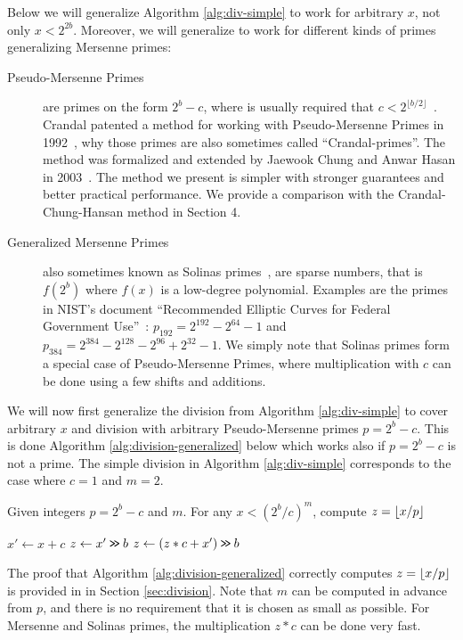 Below we will generalize Algorithm \ref{alg:div-simple} to work for
arbitrary $x$, not only $x<2^{2b}$. Moreover, we will generalize
to work for different kinds of primes generalizing Mersenne primes:
\begin{description}
   \item[Pseudo-Mersenne Primes]
      are primes on the form $2^b-c$, where is usually required that $c < 2^{\lfloor b/2\rfloor}$~\cite{van2014encyclopedia}.
      Crandal patented a method for working with Pseudo-Mersenne Primes in 1992~\cite{crandall1992method},
      why those primes are also sometimes called ``Crandal-primes''.
      The method was formalized and extended by Jaewook Chung and Anwar Hasan in 2003~\cite{chung2003more}. The method we present is simpler with
      stronger guarantees and better practical performance.
      We provide a comparison with the Crandal-Chung-Hansan method in Section 4.
   \item[Generalized Mersenne Primes]
      also sometimes known as Solinas primes~\cite{Solinas2011}, are sparse numbers, that is $f(2^b)$ where $f(x)$ is a low-degree polynomial.
      Examples are the primes in NIST's document ``Recommended Elliptic Curves for Federal Government Use''~\cite{nist}:
         $p_{192} = 2^{192} - 2^{64} - 1$
      and
         $p_{384} = 2^{384}-2^{128}-2^{96}+2^{32}-1$.
      We simply note that Solinas primes form a special case of
      Pseudo-Mersenne Primes, where multiplication with $c$
      can be done using a few shifts and additions.
\end{description}
We will now first generalize the division from Algorithm \ref{alg:div-simple}
to cover arbitrary $x$ and division with arbitrary Pseudo-Mersenne primes $p=2^b-c$. This is done Algorithm \ref{alg:division-generalized} below which
works also if $p=2^b-c$ is not a prime.  The
simple division in Algorithm \ref{alg:div-simple} corresponds to the case
where $c=1$ and $m=2$.
\begin{algorithm}[H]
  \caption{Given integers $p=2^b-c$ and $m$.
    For any $x< (2^b/c)^m$, compute $z=\lfloor {x/p} \rfloor$}
   \label{alg:division-generalized}
   \begin{algorithmic}
         \State $x' \gets x + c$
         \State $z \gets x' \mathbin{\texttt{>\!>}} b$
            \State $z \gets (z * c + x')\mathbin{\texttt{>\!>}} b$
         \EndFor
   \end{algorithmic}
\end{algorithm}
The proof that Algorithm \ref{alg:division-generalized} correctly computes
 $z=\lfloor {x/p} \rfloor$ is provided in in Section \ref{sec:division}.
Note that $m$ can be computed in advance from $p$, and there is no requirement that it is chosen as small as possible.
For Mersenne and Solinas primes, the multiplication $z*c$ can be done very fast.

